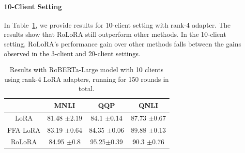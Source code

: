 \documentclass{article}
\newcommand{\com}[1]{\tiny$\pm$#1}
\theoremstyle{plain}
\theoremstyle{definition}
\theoremstyle{remark}
\begin{document}
 
\paragraph{10-Client Setting}
In Table~\ref{tab:10-client-rank-4}, we provide results for 10-client setting with rank-4 adapter. The results show that RoLoRA still outperform other methods. In the 10-client setting, RoLoRA's performance gain over other methods falls between the gains observed in the 3-client and 20-client settings.


\begin{table}[h]
    \centering
    {\footnotesize
    \begin{tabular}{cccc}
    \toprule
         & MNLI & QQP & QNLI\\
         \midrule
        LoRA & 81.48 \com 2.19 & 84.1 \com 0.14 & 87.73 \com 0.67\\
        FFA-LoRA & 83.19 \com 0.64 & 84.35 \com 0.06 & 89.88 \com 0.13\\
        \rowcolor{ours} RoLoRA & 84.95 \com 0.8 & 95.25\com 0.39 & 90.3 \com 0.76\\
         \bottomrule
    \end{tabular}
    \vspace{4pt}}
    \caption{Results with RoBERTa-Large model with 10 clients using rank-4 LoRA adapters, running for 150 rounds in total.}
    \label{tab:10-client-rank-4}
\end{table}
\end{document}
